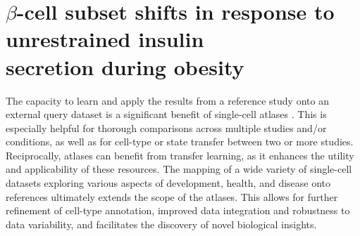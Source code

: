 \section[$\beta$-cell subset shifts in response to unrestrained insulin secretion during obesity]{$\beta$-cell subset shifts in response to unrestrained insulin\\secretion during obesity}
\label{sec:chp3_validation}


\par The capacity to learn and apply the results from a reference study onto an external query dataset is a significant benefit of single-cell atlases \textbf{\cite{lotfollahi_mapping_2021,lotfollahi_biologically_2023,ye_mapping_2024}}. This is especially helpful for thorough comparisons across multiple studies and/or conditions, as well as for cell-type or state transfer between two or more studies. Reciprocally, atlases can benefit from transfer learning, as it enhances the utility and applicability of these resources. The mapping of a wide variety of single-cell datasets exploring various aspects of development, health, and disease onto references ultimately extends the scope of the atlases. This allows for further refinement of cell-type annotation, improved data integration and robustness to data variability, and facilitates the discovery of novel biological insights.\\

